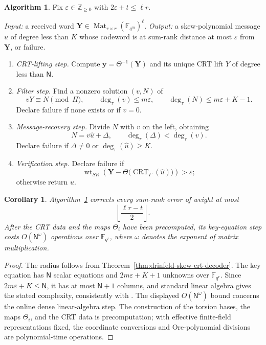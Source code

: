 \documentclass[10pt,a4paper]{amsart}
\DeclareMathOperator{\Mat}{Mat}
\DeclareMathOperator{\wt}{wt}
\theoremstyle{definition}
\newtheorem{algorithm}[definition]{Algorithm}
\theoremstyle{plain}
\newtheorem{corollary}[definition]{Corollary}
\theoremstyle{remark}
\newcommand{\vF}{\mathbb F}
\renewcommand{\epsilon}{\varepsilon}
\begin{document}
\begin{algorithm}
\label{alg:explicit-skew-crt-decoder}
Fix $\epsilon\in\mathbb Z_{\geq 0}$ with
$2\epsilon+t\leq\ell r$.

\emph{Input:} a received word
$\boldsymbol Y\in\Mat_{r\times r}(\vF_{q^m})^\ell$.
\emph{Output:} a skew-polynomial message $\widehat u$ of degree less than
$K$ whose codeword is at sum-rank distance at most $\epsilon$ from
$\boldsymbol Y$, or failure.

\begin{enumerate}
\item \emph{CRT-lifting step.} Compute
$\boldsymbol y=\Theta^{-1}(\boldsymbol Y)$ and its unique CRT lift $Y$ of
degree less than $\mathsf N$.

\item \emph{Filter step.} Find a nonzero solution $(v,N)$ of
$$
vY\equiv N\pmod{\Pi},
\qquad
\deg_\tau(v)\leq m\epsilon,
\qquad
\deg_\tau(N)\leq m\epsilon+K-1.
$$
Declare failure if none exists or if $v=0$.

\item \emph{Message-recovery step.} Divide $N$ with $v$ on the left,
obtaining
$$
N=v\widehat u+\Delta,
\qquad
\deg_\tau(\Delta)<\deg_\tau(v).
$$
Declare failure if $\Delta\neq0$ or
$\deg_\tau(\widehat u)\geq K$.

\item \emph{Verification step.} Declare failure if
$$
\wt_{SR}\left(
\boldsymbol Y-
\Theta\bigl(\operatorname{CRT}_\Gamma(\widehat u)\bigr)
\right)>\epsilon;
$$
otherwise return $\widehat u$.
\end{enumerate}
\end{algorithm}

\begin{corollary}
Algorithm~\ref{alg:explicit-skew-crt-decoder} corrects every sum-rank error
of weight at most
$$
\left\lfloor\frac{\ell r-t}{2}\right\rfloor.
$$
After the CRT data and the maps $\Theta_i$ have been precomputed, its
key-equation step costs $O(\mathsf N^\omega)$ operations over
$\vF_{q^r}$, where $\omega$ denotes the exponent of matrix multiplication.
\end{corollary}

\begin{proof}
The radius follows from Theorem~\ref{thm:drinfeld-skew-crt-decoder}. The key
equation has $\mathsf N$ scalar equations and $2m\epsilon+K+1$ unknowns over
$\vF_{q^r}$. Since $2m\epsilon+K\leq\mathsf N$, it has at most
$\mathsf N+1$ columns, and standard linear algebra gives the stated
complexity, consistently with \cite[Proposition~8]{NR26}. The displayed
$O(\mathsf N^\omega)$ bound concerns the online dense linear-algebra step.
The construction of the torsion bases, the maps $\Theta_i$, and the CRT data
is precomputation; with effective finite-field representations fixed, the
coordinate conversions and Ore-polynomial divisions are polynomial-time
operations.
\end{proof}
\end{document}
